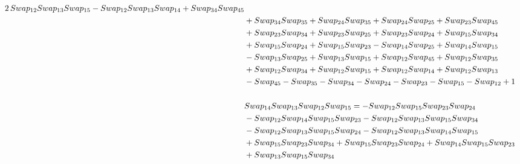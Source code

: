 \documentclass[10pt,a4paper]{amsart}
\begin{document}
\begin{align*}
        2\,\textnormal{Swap}_{12} \textnormal{Swap}_{13} \textnormal{Swap}_{15} - \textnormal{Swap}_{12} \textnormal{Swap}_{13} \textnormal{Swap}_{14} + \textnormal{Swap}_{34} \textnormal{Swap}_{45}\\ & + \textnormal{Swap}_{34} \textnormal{Swap}_{35} + \textnormal{Swap}_{24} \textnormal{Swap}_{35} + \textnormal{Swap}_{24} \textnormal{Swap}_{25} +
        \textnormal{Swap}_{23} \textnormal{Swap}_{45}\\ & + \textnormal{Swap}_{23} \textnormal{Swap}_{34} + \textnormal{Swap}_{23} \textnormal{Swap}_{25} + \textnormal{Swap}_{23} \textnormal{Swap}_{24} + \textnormal{Swap}_{15} \textnormal{Swap}_{34}\\ & + \textnormal{Swap}_{15} \textnormal{Swap}_{24} + \textnormal{Swap}_{15} \textnormal{Swap}_{23} -
        \textnormal{Swap}_{14} \textnormal{Swap}_{25} + \textnormal{Swap}_{14} \textnormal{Swap}_{15}\\ & - \textnormal{Swap}_{13} \textnormal{Swap}_{25} + \textnormal{Swap}_{13} \textnormal{Swap}_{15} + \textnormal{Swap}_{12} \textnormal{Swap}_{45} + \textnormal{Swap}_{12} \textnormal{Swap}_{35}\\ & + \textnormal{Swap}_{12} \textnormal{Swap}_{34} +
        \textnormal{Swap}_{12} \textnormal{Swap}_{15} + \textnormal{Swap}_{12} \textnormal{Swap}_{14} + \textnormal{Swap}_{12} \textnormal{Swap}_{13}\\ & - \textnormal{Swap}_{45} - \textnormal{Swap}_{35} - \textnormal{Swap}_{34} - \textnormal{Swap}_{24} - \textnormal{Swap}_{23} - \textnormal{Swap}_{15} - \textnormal{Swap}_{12} +
        1\\
        \\
        &\textnormal{Swap}_{14}   \textnormal{Swap}_{13}   \textnormal{Swap}_{12}   \textnormal{Swap}_{15} =  -\textnormal{Swap}_{12} \textnormal{Swap}_{15} \textnormal{Swap}_{23} \textnormal{Swap}_{24}\\ & - \textnormal{Swap}_{12} \textnormal{Swap}_{14} \textnormal{Swap}_{15} \textnormal{Swap}_{23} - \textnormal{Swap}_{12} \textnormal{Swap}_{13} \textnormal{Swap}_{15} \textnormal{Swap}_{34}\\ & - \textnormal{Swap}_{12} \textnormal{Swap}_{13} \textnormal{Swap}_{15} \textnormal{Swap}_{24} -
        \textnormal{Swap}_{12} \textnormal{Swap}_{13} \textnormal{Swap}_{14} \textnormal{Swap}_{15}\\ & + \textnormal{Swap}_{15} \textnormal{Swap}_{23} \textnormal{Swap}_{34} + \textnormal{Swap}_{15} \textnormal{Swap}_{23} \textnormal{Swap}_{24} + \textnormal{Swap}_{14} \textnormal{Swap}_{15} \textnormal{Swap}_{23}\\ & + \textnormal{Swap}_{13} \textnormal{Swap}_{15} \textnormal{Swap}_{34}

\end{align*}
\end{document}
